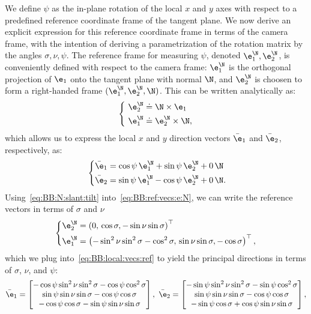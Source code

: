 We define $\psi$ as the in-plane rotation of the
local $x$ and $y$ axes with respect to a predefined reference coordinate frame of the
tangent plane. We now derive an explicit expression for this reference
coordinate frame in terms of the camera frame, with the intention of deriving a
parametrization of the rotation matrix by the angles $\sigma,\nu,\psi$.
The reference frame for measuring $\psi$, denoted $\e_1^\N,\e_2^\N$, is conveniently 
defined with respect to the camera frame: $\e_1^\N$ is the orthogonal projection of $\e_1$ onto
the tangent plane with normal $\N$, and $\e_2^\N$ is choosen to form a
right-handed frame $(\e_1^\N,\e_2^\N,\N)$. This can be written analytically as:
\begin{equation}
\left\{
\begin{aligned}~\label{eq:BB:ref:vecs:e:N} 
\e_2^\N &\doteq \N\times\e_1\\
\e_1^\N &\doteq \e_2^\N\times\N,
\end{aligned}
\right.
\end{equation}
which allows us to express the local $x$ and $y$ direction vectors $\bar \e_1$
and $\bar \e_2$, respectively, as:
\begin{equation}~\label{eq:BB:local:vecs:ref}
\left\{
\begin{aligned}
\bar \e_1 &= \cos\psi\,\e_1^\N + \sin\psi\,\e_2^\N + 0\,\N\\
\bar \e_2 &= \sin\psi\,\e_1^\N - \cos\psi\,\e_2^\N + 0\,\N.
\end{aligned}
\right.
\end{equation}
Using~\eqref{eq:BB:N:slant:tilt} into~\eqref{eq:BB:ref:vecs:e:N}, we can write the
reference vectors in terms of $\sigma$ and $\nu$
\begin{equation}\label{eq:BB:eq:ref:vecs:slant:tilt:psi}
\left\{
\begin{aligned}
\e_2^\N &= \left( 0,\,\cos\sigma,-\sin\nu\sin\sigma \right)^\top\\
\e_1^\N &= \left( -\sin^2\nu\sin^2\sigma - \cos^2\sigma,\,\sin\nu\sin\sigma,-\cos\sigma \right)^\top,
\end{aligned}
\right.
\end{equation}
which we plug into~\eqref{eq:BB:local:vecs:ref} to yield the principal directions in
terms of $\sigma$, $\nu$, and $\psi$:
\begin{equation}\label{eq:BB:eq:principal:direcs:slant:tilt:psi}
\bar \e_1 = 
\begin{bmatrix}
-\cos\psi\sin^2\nu\sin^2\sigma - \cos\psi\cos^2\sigma\\
\sin\psi\sin\nu\sin\sigma - \cos\psi\cos\sigma\\
-\cos\psi\cos\sigma-\sin\psi\sin\nu\sin\sigma 
\end{bmatrix},\ 
\bar \e_2 = 
\begin{bmatrix}
-\sin\psi\sin^2\nu\sin^2\sigma - \sin\psi\cos^2\sigma\\
\sin\psi\sin\nu\sin\sigma - \cos\psi\cos\sigma\\
-\sin\psi\cos\sigma + \cos\psi\sin\nu\sin\sigma
\end{bmatrix},
\end{equation}
